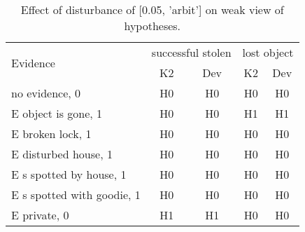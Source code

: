 \begin{table}\begin{tabular}{l|cc|cc}\toprule\multirow{2}{*}{Evidence} & \multicolumn{2}{c}{successful stolen}& \multicolumn{2}{c}{lost object}\\& {K2} & {Dev}& {K2} & {Dev}\\\midrule
no evidence, 0 & H0&H0&H0&H0\\E object is gone, 1 & H0&H0&H1&H1\\E broken lock, 1 & H0&H0&H0&H0\\E disturbed house, 1 & H0&H0&H0&H0\\E s spotted by house, 1 & H0&H0&H0&H0\\E s spotted with goodie, 1 & H0&H0&H0&H0\\E private, 0 & H1&H1&H0&H0\\\bottomrule\end{tabular}\caption{Effect of disturbance of [0.05, 'arbit'] on weak view of hypotheses.}\end{table}